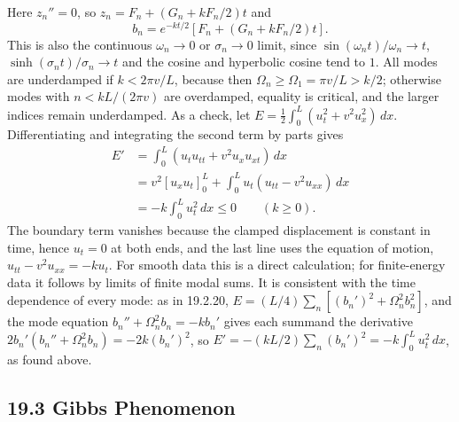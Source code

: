 Here $z_n''=0$, so $z_n=F_n+(G_n+kF_n/2)t$ and
\[
\boxed{b_n=e^{-kt/2}[F_n+(G_n+kF_n/2)t].}
\]
This is also the continuous $\omega_n\to0$ or $\sigma_n\to0$ limit,
since $\sin(\omega_nt)/\omega_n\to t$, $\sinh(\sigma_nt)/\sigma_n\to t$
and the cosine and hyperbolic cosine tend to $1$.
All modes are underdamped if $k<2\pi v/L$, because then
$\Omega_n\ge\Omega_1=\pi v/L>k/2$; otherwise modes with
$n<kL/(2\pi v)$ are overdamped, equality is critical, and the larger
indices remain underdamped.
As a check, let $E=\tfrac12\int_0^L(u_t^2+v^2u_x^2)\,dx$.
Differentiating and integrating the second term by parts gives
\begin{align*}
E'&=\int_0^L(u_tu_{tt}+v^2u_xu_{xt})\,dx\\
&=v^2[u_xu_t]_0^L+\int_0^Lu_t(u_{tt}-v^2u_{xx})\,dx\\
&=-k\int_0^Lu_t^2\,dx\le0\qquad(k\ge0).
\end{align*}
The boundary term vanishes because the clamped displacement is constant
in time, hence $u_t=0$ at both ends, and the last line uses the equation
of motion, $u_{tt}-v^2u_{xx}=-ku_t$. For smooth data this is a direct
calculation; for finite-energy data it follows by limits of finite modal
sums. It is consistent with the time dependence of every mode: as in
19.2.20, $E=(L/4)\sum_n[(b_n')^2+\Omega_n^2b_n^2]$, and the mode
equation $b_n''+\Omega_n^2b_n=-kb_n'$ gives each summand the derivative
$2b_n'(b_n''+\Omega_n^2b_n)=-2k(b_n')^2$, so
$E'=-(kL/2)\sum_n(b_n')^2=-k\int_0^Lu_t^2\,dx$, as found above.

\subsection*{19.3 Gibbs Phenomenon}

